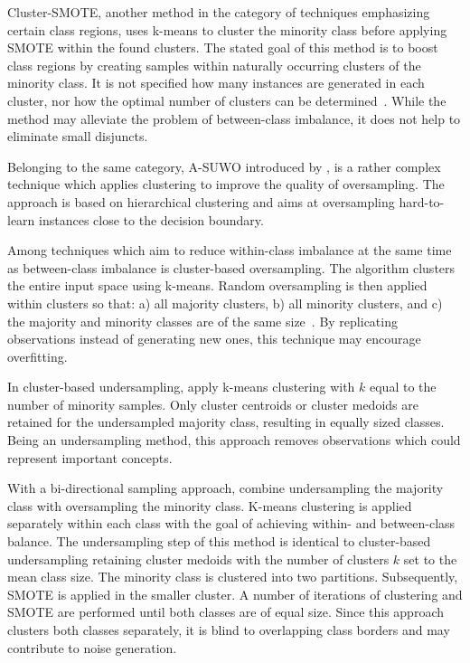 \documentclass[sort&compress]{elsarticle}
\begin{document}
Cluster-SMOTE, another method in the category of techniques emphasizing certain class regions, uses k-means to cluster the minority class before applying \ac{SMOTE} within the found clusters. The stated goal of this method is to boost class regions by creating samples within naturally occurring clusters of the minority class. It is not specified how many instances are generated in each cluster, nor how the optimal number of clusters can be determined~\citep{Cieslak.2006}. While the method may alleviate the problem of between-class imbalance, it does not help to eliminate small disjuncts.

Belonging to the same category, \ac{A-SUWO} introduced by \citet{Nekooeimehr.2016}, is a rather complex technique which applies clustering to improve the quality of oversampling. The approach is based on hierarchical clustering and aims at oversampling hard-to-learn instances close to the decision boundary.

Among techniques which aim to reduce within-class imbalance at the same time as between-class imbalance is cluster-based oversampling. The algorithm clusters the entire input space using k-means. Random oversampling is then applied within clusters so that: a) all majority clusters, b) all minority clusters, and c) the majority and minority classes are of the same size~\citep{Jo.2004}. By replicating observations instead of generating new ones, this technique may encourage overfitting.

In cluster-based undersampling, \citet{Lin.2017} apply k-means clustering with $k$ equal to the number of minority samples. Only cluster centroids or cluster medoids are retained for the undersampled majority class, resulting in equally sized classes. Being an undersampling method, this approach removes observations which could represent important concepts.

With a bi-directional sampling approach, \citet{Song.2016} combine undersampling the majority class with oversampling the minority class. K-means clustering is applied separately within each class with the goal of achieving within- and between-class balance. The undersampling step of this method is identical to cluster-based undersampling \citep{Lin.2017} retaining cluster medoids with the number of clusters $k$ set to the mean class size. The minority class is clustered into two partitions. Subsequently, \ac{SMOTE} is applied in the smaller cluster. A number of iterations of clustering and \ac{SMOTE} are performed until both classes are of equal size. Since this approach clusters both classes separately, it is blind to overlapping class borders and may contribute to noise generation.
\end{document}
